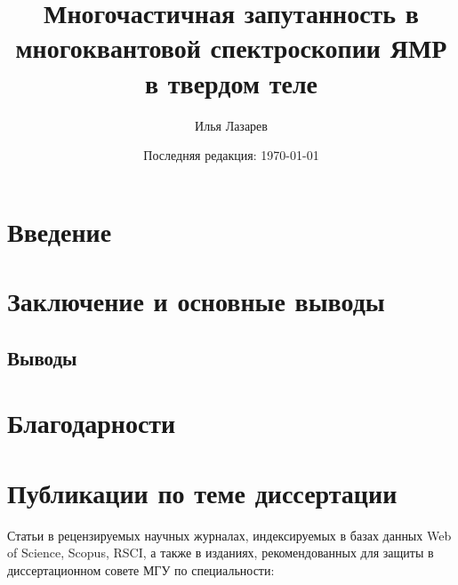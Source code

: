 \documentclass[14pt]{extreport}
\title{Многочастичная запутанность в многоквантовой спектроскопии ЯМР в твердом теле}
\author{Илья Лазарев}
\date{Последняя редакция: \today}
\begin{document}
\addtocounter{page}{1}
\tableofcontents
\chapter*{Введение}






\chapter*{Заключение и основные выводы}

\section*{Выводы}
\begin{enumerate}
  
\end{enumerate}
\chapter*{Благодарности}

\chapter*{Публикации по теме диссертации}
Статьи в рецензируемых научных журналах, индексируемых в базах данных Web of Science, Scopus, RSCI, а также в изданиях, рекомендованных для защиты в диссертационном совете МГУ по специальности:
\begin{enumerate}
  
\end{enumerate}



\end{document}

